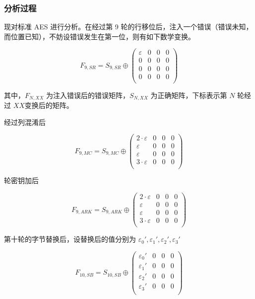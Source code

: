 \documentclass[a4paper, zihao=-4, UTF-8]{ctexart}
\newcommand{\upcite}[1]{{\textsuperscript{\cite{#1}}}}
\begin{document}
	\subsubsection{分析过程} 现对标准 AES 进行分析。在经过第 9 轮的行移位后，注入一个错误（错误未知，而位置已知），不妨设错误发生在第一位，则有如下数学变换\upcite{1, 2}。
	
	$$F_{9,SR}=S_{9,SR}\oplus \left(\begin{matrix}
		\varepsilon & 0 & 0 & 0\\
		0 & 0 & 0 & 0\\
		0 & 0 & 0 & 0\\
		0 & 0 & 0 & 0\\
	\end{matrix}\right)$$
	
	其中，$F_{N,XX}$ 为注入错误后的错误矩阵，$S_{N,XX}$ 为正确矩阵，下标表示第 $N$ 轮经过 $XX$变换后的矩阵。
	
	经过列混淆后
	
	$$F_{9,MC}=S_{9,MC}\oplus \left(\begin{matrix}
		2\cdot\varepsilon & 0 & 0 & 0\\
		\varepsilon & 0 & 0 & 0\\
		\varepsilon & 0 & 0 & 0\\
		3\cdot\varepsilon & 0 & 0 & 0\\
	\end{matrix}\right)$$
	
	轮密钥加后
	
	$$F_{9,ARK}=S_{9,ARK}\oplus \left(\begin{matrix}
		2\cdot\varepsilon & 0 & 0 & 0\\
		\varepsilon & 0 & 0 & 0\\
		\varepsilon & 0 & 0 & 0\\
		3\cdot\varepsilon & 0 & 0 & 0\\
	\end{matrix}\right)$$
	
	第十轮的字节替换后，设替换后的值分别为 $\varepsilon_0', \varepsilon_1', \varepsilon_2', \varepsilon_3'$
	
	$$F_{10,SB}=S_{10,SB}\oplus \left(\begin{matrix}
		\varepsilon_0' & 0 & 0 & 0\\
		\varepsilon_1' & 0 & 0 & 0\\
		\varepsilon_2' & 0 & 0 & 0\\
		\varepsilon_3' & 0 & 0 & 0\\
	\end{matrix}\right)$$
	
\end{document}
